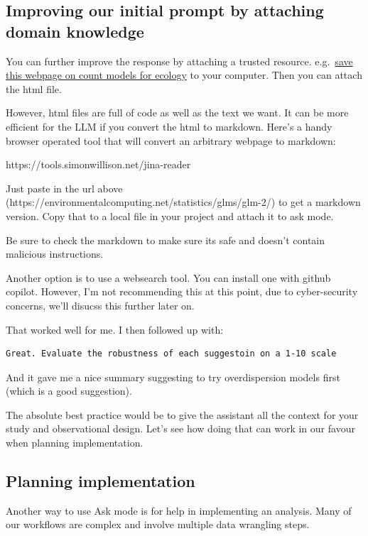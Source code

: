 \documentclass[
  letterpaper,
  DIV=11,
  numbers=noendperiod]{scrreprt}
\begin{document}
\subsection{Improving our initial prompt by attaching domain
knowledge}\label{improving-our-initial-prompt-by-attaching-domain-knowledge}

You can further improve the response by attaching a trusted resource.
e.g.~\href{https://environmentalcomputing.net/statistics/glms/glm-2/}{save
this webpage on count models for ecology} to your computer. Then you can
attach the html file.

However, html files are full of code as well as the text we want. It can
be more efficient for the LLM if you convert the html to markdown.
Here's a handy browser operated tool that will convert an arbitrary
webpage to markdown:

https://tools.simonwillison.net/jina-reader

Just paste in the url above
(https://environmentalcomputing.net/statistics/glms/glm-2/) to get a
markdown version. Copy that to a local file in your project and attach
it to ask mode.

Be sure to check the markdown to make sure its safe and doesn't contain
malicious instructions.

Another option is to use a websearch tool. You can install one with
github copilot. However, I'm not recommending this at this point, due to
cyber-security concerns, we'll disucss this further later on.

That worked well for me. I then followed up with:

\begin{verbatim}
Great. Evaluate the robustness of each suggestoin on a 1-10 scale
\end{verbatim}

And it gave me a nice summary suggesting to try overdispersion models
first (which is a good suggestion).

The absolute best practice would be to give the assistant all the
context for your study and observational design. Let's see how doing
that can work in our favour when planning implementation.

\subsection{Planning implementation}\label{planning-implementation}

Another way to use Ask mode is for help in implementing an analysis.
Many of our workflows are complex and involve multiple data wrangling
steps.
\end{document}
